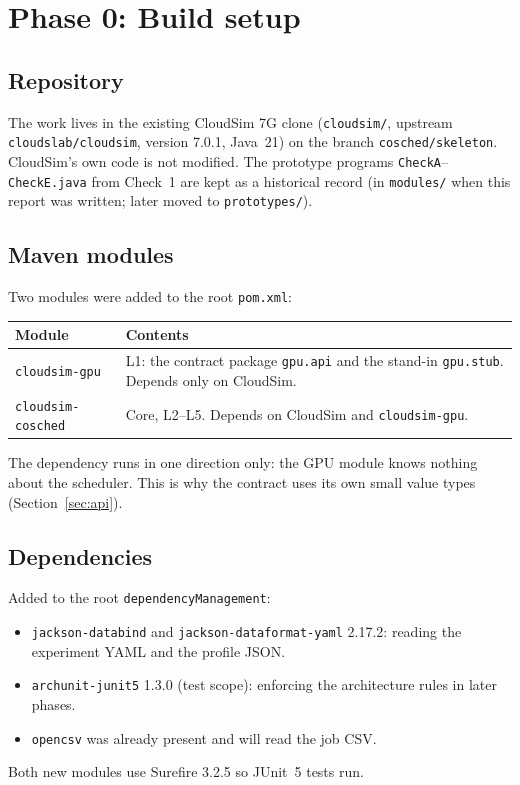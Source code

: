 \documentclass[11pt,a4paper]{article}
\newcommand{\code}[1]{\texttt{#1}}
\begin{document}
\section{Phase 0: Build setup}

\subsection{Repository}
The work lives in the existing CloudSim 7G clone (\code{cloudsim/}, upstream
\code{cloudslab/cloudsim}, version 7.0.1, Java~21) on the branch \code{cosched/skeleton}.
CloudSim's own code is not modified. The prototype programs \code{CheckA}--\code{CheckE.java}
from Check~1 are kept as a historical record (in \code{modules/} when this report was written; later moved to \code{prototypes/}).

\subsection{Maven modules}
Two modules were added to the root \code{pom.xml}:

\begin{center}
\begin{tabularx}{\linewidth}{@{}lX@{}}
\toprule
Module & Contents \\
\midrule
\code{cloudsim-gpu} & L1: the contract package \code{gpu.api} and the stand-in
  \code{gpu.stub}. Depends only on CloudSim. \\
\code{cloudsim-cosched} & Core, L2--L5. Depends on CloudSim and \code{cloudsim-gpu}. \\
\bottomrule
\end{tabularx}
\end{center}

The dependency runs in one direction only: the GPU module knows nothing about the scheduler.
This is why the contract uses its own small value types (Section~\ref{sec:api}).

\subsection{Dependencies}
Added to the root \code{dependencyManagement}:
\begin{itemize}
  \item \code{jackson-databind} and \code{jackson-dataformat-yaml} 2.17.2: reading the experiment
        YAML and the profile JSON.
  \item \code{archunit-junit5} 1.3.0 (test scope): enforcing the architecture rules in later phases.
  \item \code{opencsv} was already present and will read the job CSV.
\end{itemize}
Both new modules use Surefire 3.2.5 so JUnit~5 tests run.
\end{document}
